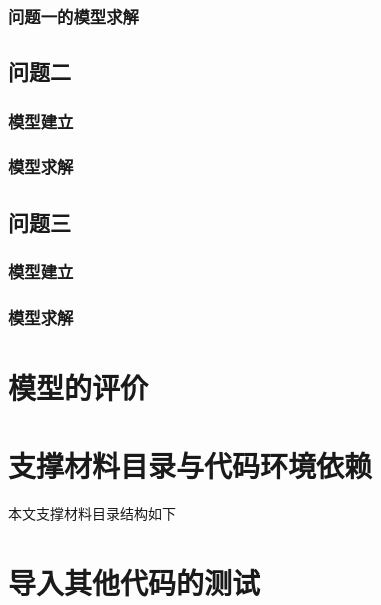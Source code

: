  \subsubsection{问题一的模型求解}
    
\subsection{问题二}
  \subsubsection{模型建立}
    
  \subsubsection{模型求解}
    
\subsection{问题三}
  \subsubsection{模型建立}
    
  \subsubsection{模型求解}
    

\section{模型的评价}
  


\newpage
\nocite{*}



\newpage
\begin{appendices} %
  \section{支撑材料目录与代码环境依赖}
    本文支撑材料目录结构如下
    

  \section{导入其他代码的测试}
  

\end{appendices}


